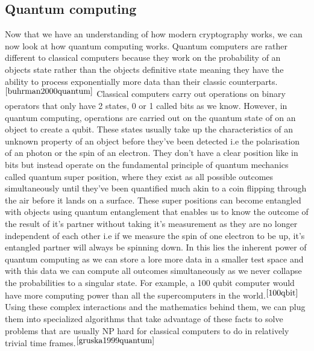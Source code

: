 \documentclass[10pt,a4paper]{IEEEtran}
\begin{document}
\subsection{Quantum computing}
Now that we have an understanding of how modern cryptography works, we can now look at how quantum computing works. Quantum computers are rather different to classical computers because they work on the probability of an objects state rather than the objects definitive state meaning they have the ability to process exponentially more data than their classic counterparts.\(^{\cite{buhrman2000quantum}}\)
\newline
Classical computers carry out operations on binary operators that only have 2 states, 0 or 1 called bits as we know. However, in quantum computing, operations are carried out on the quantum state of on an object to create a qubit. These states usually take up the characteristics of an unknown property of an object before they've been detected i.e the polarisation of an photon or the spin of an electron. They don't have a clear position like in bits but instead operate on the fundamental principle of quantum mechanics called quantum super position, where they exist as all possible outcomes simultaneously until they've been quantified much akin to a coin flipping through the air before it lands on a surface. 
\newline
These super positions can become entangled with objects using quantum entanglement that enables us to know the outcome of the result of it's partner without taking it's measurement as they are no longer independent of each other i.e if we measure the spin of one electron to be up, it's entangled partner will always be spinning down. In this lies the inherent power of quantum computing as we can store a lore more data in a smaller test space and with this data we can compute all outcomes simultaneously as we never collapse the probabilities to a singular state. For example, a 100 qubit computer would have more computing power than all the supercomputers in the world.\(^{\cite{100qbit}}\)
\newline
Using these complex interactions and the mathematics behind them, we can plug them into specialized algorithms that take advantage of these facts to solve problems that are usually NP hard for classical computers to do in relatively trivial time frames.\(^{\cite{gruska1999quantum}}\)
\end{document}
